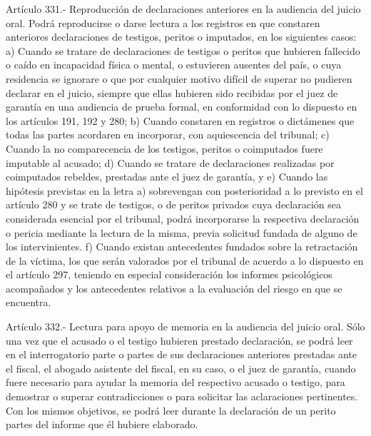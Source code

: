     Artículo 331.- Reproducción de declaraciones anteriores en la audiencia del juicio oral. Podrá reproducirse o darse lectura a los registros en que constaren anteriores declaraciones de testigos, peritos o imputados, en los siguientes casos:
    a) Cuando se tratare de declaraciones de testigos o peritos que hubieren fallecido o caído en incapacidad física o mental, o estuvieren ausentes del país, o cuya residencia se ignorare o que por cualquier motivo difícil de superar no pudieren declarar en el juicio, siempre que ellas hubieren sido recibidas por el juez de garantía en una audiencia de prueba formal, en conformidad con lo dispuesto en los artículos 191, 192 y 280;
    b) Cuando constaren en registros o dictámenes que todas las partes acordaren en incorporar, con aquiescencia del tribunal;
    c) Cuando la no comparecencia de los testigos, peritos o coimputados fuere imputable al acusado;
    d) Cuando se tratare de declaraciones realizadas por coimputados rebeldes, prestadas ante el juez de garantía, y
    e) Cuando las hipótesis previstas en la letra a) sobrevengan con posterioridad a lo previsto en el artículo 280 y se trate de testigos, o de peritos privados cuya declaración sea considerada esencial por el tribunal, podrá incorporarse la respectiva declaración o pericia mediante la lectura de la misma, previa solicitud fundada de alguno de los intervinientes.
    f) Cuando existan antecedentes fundados sobre la retractación de la víctima, los que serán valorados por el tribunal de acuerdo a lo dispuesto en el artículo 297, teniendo en especial consideración los informes psicológicos acompañados y los antecedentes relativos a la evaluación del riesgo en que se encuentra.



    Artículo 332.- Lectura para apoyo de memoria en la audiencia del juicio oral. Sólo una vez que el acusado o el testigo hubieren prestado declaración, se podrá leer en el interrogatorio parte o partes de sus declaraciones anteriores prestadas ante el fiscal, el abogado asistente del fiscal, en su caso, o el juez de garantía, cuando fuere necesario para ayudar la memoria del respectivo acusado o testigo, para demostrar o superar contradicciones o para solicitar las aclaraciones pertinentes.
    Con los mismos objetivos, se podrá leer durante la declaración de un perito partes del informe que él hubiere elaborado.



